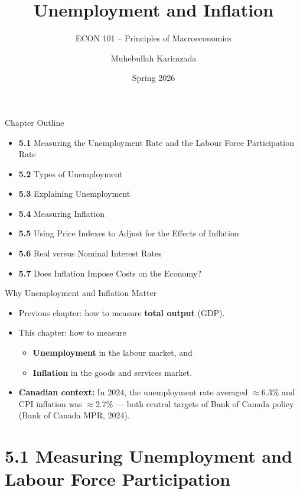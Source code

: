 \documentclass[aspectratio=169]{beamer}
\title{\textbf{Unemployment and Inflation}}
\subtitle{{\large ECON 101 -- Principles of Macroeconomics}}
\author{Muhebullah Karimzada}
\date{Spring 2026}
\begin{document}

\begin{frame}[plain]
  \titlepage
\end{frame}

\begin{frame}{Chapter Outline}
\transfade
\begin{itemize}[<+->]
  \item \textbf{5.1} Measuring the Unemployment Rate and the Labour Force Participation Rate
  \item \textbf{5.2} Types of Unemployment
  \item \textbf{5.3} Explaining Unemployment
  \item \textbf{5.4} Measuring Inflation
  \item \textbf{5.5} Using Price Indexes to Adjust for the Effects of Inflation
  \item \textbf{5.6} Real versus Nominal Interest Rates
  \item \textbf{5.7} Does Inflation Impose Costs on the Economy?
\end{itemize}
\end{frame}

\begin{frame}{Why Unemployment and Inflation Matter}
\transfade
\begin{itemize}[<+->]
  \item Previous chapter: how to measure \textbf{total output} (GDP).
  \item This chapter: how to measure
  \begin{itemize}[<+->]
    \item \textbf{Unemployment} in the labour market, and
    \item \textbf{Inflation} in the goods and services market.
  \end{itemize}
  \item \textbf{Canadian context:} In 2024, the unemployment rate averaged $\approx$6.3\% and CPI inflation was $\approx$2.7\% --- both central targets of Bank of Canada policy (Bank of Canada MPR, 2024).
\end{itemize}
\end{frame}

\section{5.1 Measuring Unemployment and Labour Force Participation}
\end{document}

